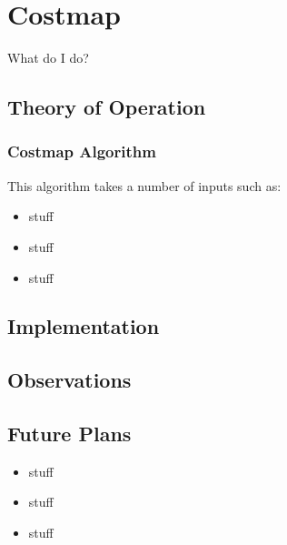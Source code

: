 \section{Costmap}

What do I do?

\subsection{Theory of Operation}


\subsubsection{Costmap Algorithm}

 This algorithm takes a number
of inputs such as:

\begin{itemize}
\item
  stuff
\item
  stuff
\item
  stuff
\end{itemize}


\subsection{Implementation}


\subsection{Observations}


\subsection{Future Plans}

\begin{itemize}
\item
  stuff
\item
  stuff
\item
  stuff
\end{itemize}

